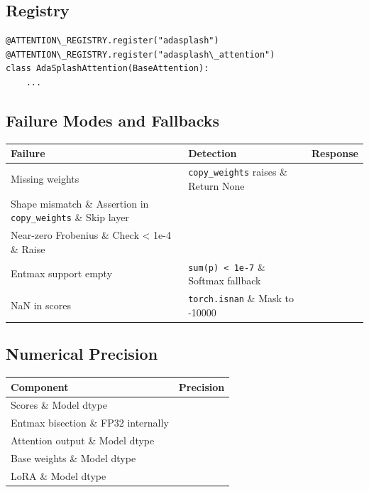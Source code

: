 \subsection{Registry}

\begin{lstlisting}
@ATTENTION\_REGISTRY.register("adasplash")
@ATTENTION\_REGISTRY.register("adasplash\_attention")
class AdaSplashAttention(BaseAttention):
    ...
\end{lstlisting}

\subsection{Failure Modes and Fallbacks}

\begin{table}[H]
\centering
\small
\begin{tabular}{lll}
\toprule
\textbf{Failure} & \textbf{Detection} & \textbf{Response} \\
\midrule
Missing weights & \texttt{copy\_weights} raises \& Return None \\
Shape mismatch \& Assertion in \texttt{copy\_weights} \& Skip layer \\
Near-zero Frobenius \& Check \textless{} 1e-4 \& Raise \\
Entmax support empty & \texttt{sum(p) \textless{} 1e-7} \& Softmax fallback \\
NaN in scores & \texttt{torch.isnan} \& Mask to -10000 \\
\bottomrule
\end{tabular}
\end{table}

\subsection{Numerical Precision}

\begin{table}[H]
\centering
\small
\begin{tabular}{ll}
\toprule
\textbf{Component} & \textbf{Precision} \\
\midrule
Scores \& Model dtype \\
Entmax bisection \& FP32 internally \\
Attention output \& Model dtype \\
Base weights \& Model dtype \\
LoRA \& Model dtype \\
\bottomrule
\end{tabular}
\end{table}

